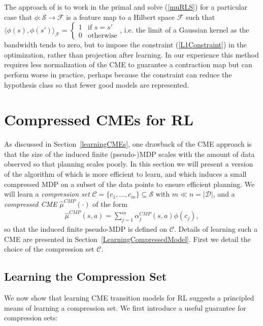 \documentclass[letterpaper]{article}
\newcommand{\CsabaFLAM}{DBLP:conf/adprl/YaoSPZ14}
\newcommand{\GrunewalderEmbeddingsRL}{GrunewalderEmbeddingsMDP}
\newcommand{\cD}{{\mathcal D}}
\newcommand{\cC}{{\mathcal C}}
\newcommand{\cF}{{\mathcal F}}
\newcommand{\cS}{{\mathcal S}}
\newcommand{\lang}{\langle}
\newcommand{\rang}{\rangle}
\begin{document}
The approach of \cite{\CsabaFLAM} is to work in the primal and solve (\ref{muRLS}) for a particular case that $\phi:\cS\to\cF$ is a feature map to a Hilbert space $\cF$ such that $\lang\phi(s),\phi(s')\rang_{\cF} = \left\{ \begin{array}{ll} 1 & \mbox{if } s=s' \\ 0 & \mbox{otherwise} \end{array}\right.$, i.e. the limit of a Gaussian kernel as the bandwidth tends to zero, but to impose the constraint (\ref{L1Constraint}) in the optimization, rather than projection after learning. In our experience this method requires less normalization of the CME to guarantee a contraction map but can perform worse in practice, perhaps because the constraint can reduce the hypothesis class so that fewer good models are represented.

\section{Compressed CMEs for RL}  \label{Compression}

As discussed in Section~\ref{learningCMEs}, one drawback of the CME approach is that the size of the induced finite (pseudo-)MDP scales with the amount of data observed so that planning scales poorly. In this section we will present a version of the algorithm of \cite{\GrunewalderEmbeddingsRL} which is more efficient to learn, and which induces a small compressed MDP on a subset of the data points to ensure efficient planning. We will learn a \emph{compression set} $\cC = \{ c_1,...,c_m \}\subseteq \cS$  with $m\ll n = |\cD|$, and a \emph{compressed CME} $\hat\mu^{CMP}(\cdot)$ of the form
\begin{align}
\hat\mu^{CMP}(s,a) = \sum_{j=1}^m \alpha^{CMP}_j(s,a) \phi(c_j), \label{CompressedCME}
\end{align}
so that the induced finite pseudo-MDP is defined on $\cC$. Details of learning such a CME are presented in Section~\ref{LearningCompressedModel}. First we detail the choice of the compression set $\cC$.

\subsection{Learning the Compression Set} \label{learningCompression}

We now show that learning CME transition models for RL suggests a principled means of learning a compression set. We first introduce a useful guarantee for compression sets:
\end{document}
